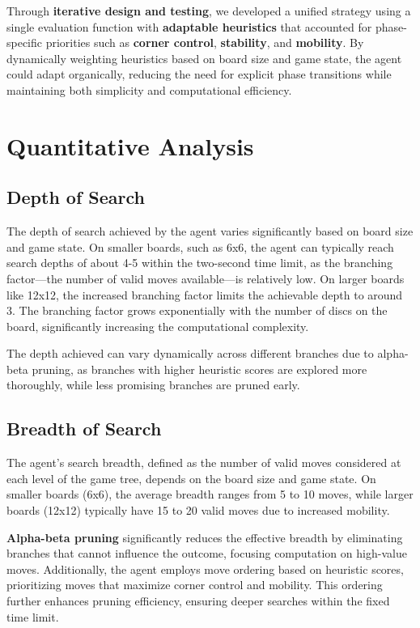 \documentclass[11pt]{article}
\begin{document}
\noindent Through \textbf{iterative design and testing}, we developed a unified strategy using a single evaluation function with \textbf{adaptable heuristics} that accounted for phase-specific priorities such as \textbf{corner control}, \textbf{stability}, and \textbf{mobility}. By dynamically weighting heuristics based on board size and game state, the agent could adapt organically, reducing the need for explicit phase transitions while maintaining both simplicity and computational efficiency.

\section*{Quantitative Analysis}
\subsection*{Depth of Search}
The depth of search achieved by the agent varies significantly based on board size and game state. On smaller boards, such as 6x6, the agent can typically reach search depths of about 4-5 within the two-second time limit, as the branching factor—the number of valid moves available—is relatively low. On larger boards like 12x12, the increased branching factor limits the achievable depth to around 3. The branching factor grows exponentially with the number of discs on the board, significantly increasing the computational complexity.

\noindent The depth achieved can vary dynamically across different branches due to alpha-beta pruning, as branches with higher heuristic scores are explored more thoroughly, while less promising branches are pruned early. 

\subsection*{Breadth of Search}
The agent’s search breadth, defined as the number of valid moves considered at each level of the game tree, depends on the board size and game state. On smaller boards (6x6), the average breadth ranges from 5 to 10 moves, while larger boards (12x12) typically have 15 to 20 valid moves due to increased mobility. 

\noindent \textbf{Alpha-beta pruning} significantly reduces the effective breadth by eliminating branches that cannot influence the outcome, focusing computation on high-value moves. Additionally, the agent employs move ordering based on heuristic scores, prioritizing moves that maximize corner control and mobility. This ordering further enhances pruning efficiency, ensuring deeper searches within the fixed time limit.
\end{document}
